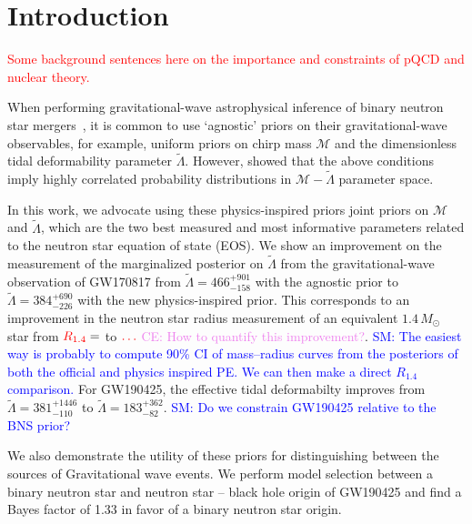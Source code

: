 \documentclass[twocolumn]{aastex631}
\newcommand{\red}[1]{\textcolor{red}{#1}}
\newcommand{\SM}[1]{\textcolor{blue}{SM: #1}}
\newcommand{\CE}[1]{\textcolor{violet}{CE: #1}}
\begin{document}
		
\section{Introduction} \label{sec:Intro}
	
\red{Some background sentences here on the  importance and constraints of pQCD and nuclear theory.}

When performing gravitational-wave astrophysical inference of binary neutron star mergers~\citep[e.g.,][]{abbott17_170817observation,abbott18_170817EOS,abbott19_170817Properties,abbott20_190425}, it is common to use `agnostic' priors on their gravitational-wave observables, for example, uniform priors on chirp mass $\mathcal{M}$ and the dimensionless tidal deformability parameter $\tilde{\Lambda}$. 
However, \citet{altiparmak22,Ecker:2022dlg} showed that the above conditions imply highly correlated probability distributions in $\mathcal{M}-\tilde{\Lambda}$ parameter space.
 	
In this work, we advocate using these physics-inspired priors joint priors on $\mathcal{M}$ and $\tilde{\Lambda}$, which are the two best measured and most informative parameters related to the neutron star equation of state (EOS).
We show an improvement on the measurement of the marginalized posterior on $\tilde{\Lambda}$ from the gravitational-wave observation of GW170817 from $\tilde{\Lambda}=466^{+901}_{-158}$ with the agnostic prior to $\tilde{\Lambda} = 384^{+690}_{-226}$ with the new physics-inspired prior.
This corresponds to an improvement in the neutron star radius measurement of an equivalent $1.4\,{M_\odot}$ star from $\red{R_{1.4}}= $ to $\red{\ldots}$ \CE{How to quantify this improvement?}. \SM{The easiest way is probably to compute 90\% CI of mass--radius curves from the posteriors of both the official and physics inspired PE. We can then make a direct $R_{1.4}$ comparison.}
For GW190425, the effective tidal deformabilty improves from $\tilde{\Lambda} = 381^{+1446}_{-110}$ to $\tilde{\Lambda} = 183^{+362}_{-82}$. \SM{Do we constrain GW190425 relative to the BNS prior?}
	
We also demonstrate the utility of these priors for distinguishing between the sources of Gravitational wave events. 
We perform model selection between a binary neutron star and neutron star -- black hole origin of GW190425 and find a Bayes factor of 1.33 in favor of a binary neutron star origin. 
	
\end{document}
